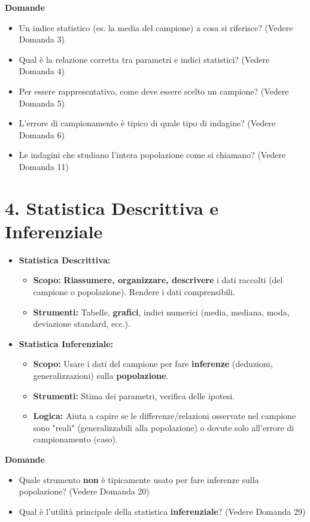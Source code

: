\documentclass[12pt, a4paper]{article}
\newenvironment{reflectionbox}{%
    \medskip %
    \begin{framed}\par\noindent
    \textbf{\color{boxtitlecolor}Domande} \par
    \begin{itemize}[leftmargin=*, label=$\blacktriangleright$]
}{%
    \end{itemize}\par
    \end{framed}
    \medskip %
}
\begin{document}
\begin{reflectionbox}
    \item Un indice statistico (es. la media del campione) a cosa si riferisce? (Vedere Domanda 3)
    \item Qual è la relazione corretta tra parametri e indici statistici? (Vedere Domanda 4)
    \item Per essere rappresentativo, come deve essere scelto un campione? (Vedere Domanda 5)
    \item L'errore di campionamento è tipico di quale tipo di indagine? (Vedere Domanda 6)
    \item Le indagini che studiano l'intera popolazione come si chiamano? (Vedere Domanda 11)
\end{reflectionbox}

\section*{4. Statistica Descrittiva e Inferenziale}
\begin{itemize}
    \item \textbf{Statistica Descrittiva:}
        \begin{itemize}
            \item \textbf{Scopo:} \textbf{Riassumere, organizzare, descrivere} i dati raccolti (del campione o popolazione). Rendere i dati comprensibili.
            \item \textbf{Strumenti:} Tabelle, \textbf{grafici}, indici numerici (media, mediana, moda, deviazione standard, ecc.).
        \end{itemize}
    \item \textbf{Statistica Inferenziale:}
        \begin{itemize}
            \item \textbf{Scopo:} Usare i dati del campione per fare \textbf{inferenze} (deduzioni, generalizzazioni) sulla \textbf{popolazione}.
            \item \textbf{Strumenti:} Stima dei parametri, verifica delle ipotesi.
            \item \textbf{Logica:} Aiuta a capire se le differenze/relazioni osservate nel campione sono "reali" (generalizzabili alla popolazione) o dovute solo all'errore di campionamento (caso).
        \end{itemize}
\end{itemize}

\begin{reflectionbox}
    \item Quale strumento \textbf{non} è tipicamente usato per fare inferenze sulla popolazione? (Vedere Domanda 20)
    \item Qual è l'utilità principale della statistica \textbf{inferenziale}? (Vedere Domanda 29)
\end{reflectionbox}
\end{document}
